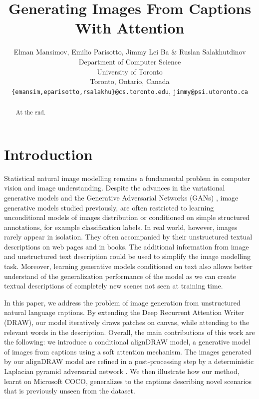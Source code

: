 \documentclass{article} %
\title{Generating Images From Captions\\ With Attention}
\author{
Elman Mansimov, Emilio Parisotto, Jimmy Lei Ba \& Ruslan Salakhutdinov\\
Department of Computer Science\\
University of Toronto\\
Toronto, Ontario, Canada \\
\texttt{\{emansim,eparisotto,rsalakhu\}@cs.toronto.edu}, \texttt{jimmy@psi.utoronto.ca}
}
\newcommand{\comm}[1]{}
\begin{document}
\maketitle

\begin{abstract}
At the end.
\end{abstract}

\section{Introduction}
Statistical natural image modelling remains a fundamental problem in computer vision and image understanding. Despite the advances in the variational generative models \cite{kingma_vae}\cite{gregor_draw} and the Generative Adversarial Networks (GANs) \citep{goodfellow_gan}\cite{denton_lapgan}, image generative models studied previously, are often restricted to learning unconditional models of images distribution or conditioned on simple structured annotations, for example classification labels. In real world, however, images rarely appear in isolation. They often accompanied by their unstructured textual descriptions on web pages and in books. The additional information from image and unstructured text description could be used to simplify the image modelling task. Moreover, learning generative models conditioned on text also allows better understand of the generalization performance of the model as we can create textual descriptions of completely new scenes not seen at training time. 

\comm{
Significant amount of recent works has been focused on generating captions from images \citep{karpathy_captions}, \citep{xu_captions}, \citep{kiros_captions} and etc. By contrast, image understanding may also be studied by generating images correctly interpreting the text description. 
Generating high dimensional realistic images from their descriptions is a more difficult approach that combines two challenging components of language modelling and image generation.  
}

In this paper, we address the problem of image generation from unstructured natural language captions. By extending the Deep Recurrent Attention Writer (DRAW)\cite{gregor_draw}, our model iteratively draws patches on canvas, while attending to the relevant words in the description. Overall, the main contributions of this work are the following: we introduce a conditional alignDRAW model, a generative model of images from captions using a soft attention mechanism. The images generated by our alignDRAW model are refined in a post-processing step by a deterministic Laplacian pyramid adversarial network \cite{denton_lapgan}. We then illustrate how our method, learnt on Microsoft COCO, generalizes to the captions describing novel scenarios that is previously unseen from the dataset.
\end{document}
